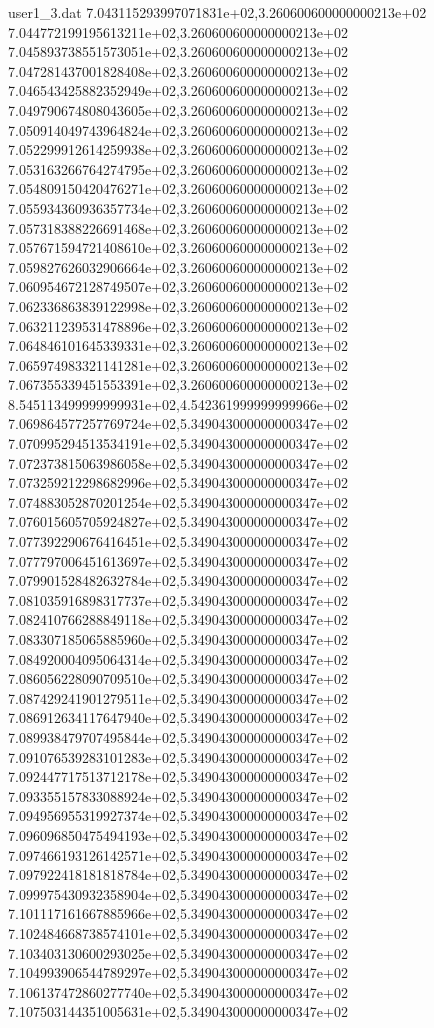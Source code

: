 \begin{filecontents}{user1_3.dat}
7.043115293997071831e+02,3.260600600000000213e+02
7.044772199195613211e+02,3.260600600000000213e+02
7.045893738551573051e+02,3.260600600000000213e+02
7.047281437001828408e+02,3.260600600000000213e+02
7.046543425882352949e+02,3.260600600000000213e+02
7.049790674808043605e+02,3.260600600000000213e+02
7.050914049743964824e+02,3.260600600000000213e+02
7.052299912614259938e+02,3.260600600000000213e+02
7.053163266764274795e+02,3.260600600000000213e+02
7.054809150420476271e+02,3.260600600000000213e+02
7.055934360936357734e+02,3.260600600000000213e+02
7.057318388226691468e+02,3.260600600000000213e+02
7.057671594721408610e+02,3.260600600000000213e+02
7.059827626032906664e+02,3.260600600000000213e+02
7.060954672128749507e+02,3.260600600000000213e+02
7.062336863839122998e+02,3.260600600000000213e+02
7.063211239531478896e+02,3.260600600000000213e+02
7.064846101645339331e+02,3.260600600000000213e+02
7.065974983321141281e+02,3.260600600000000213e+02
7.067355339451553391e+02,3.260600600000000213e+02
8.545113499999999931e+02,4.542361999999999966e+02
7.069864577257769724e+02,5.349043000000000347e+02
7.070995294513534191e+02,5.349043000000000347e+02
7.072373815063986058e+02,5.349043000000000347e+02
7.073259212298682996e+02,5.349043000000000347e+02
7.074883052870201254e+02,5.349043000000000347e+02
7.076015605705924827e+02,5.349043000000000347e+02
7.077392290676416451e+02,5.349043000000000347e+02
7.077797006451613697e+02,5.349043000000000347e+02
7.079901528482632784e+02,5.349043000000000347e+02
7.081035916898317737e+02,5.349043000000000347e+02
7.082410766288849118e+02,5.349043000000000347e+02
7.083307185065885960e+02,5.349043000000000347e+02
7.084920004095064314e+02,5.349043000000000347e+02
7.086056228090709510e+02,5.349043000000000347e+02
7.087429241901279511e+02,5.349043000000000347e+02
7.086912634117647940e+02,5.349043000000000347e+02
7.089938479707495844e+02,5.349043000000000347e+02
7.091076539283101283e+02,5.349043000000000347e+02
7.092447717513712178e+02,5.349043000000000347e+02
7.093355157833088924e+02,5.349043000000000347e+02
7.094956955319927374e+02,5.349043000000000347e+02
7.096096850475494193e+02,5.349043000000000347e+02
7.097466193126142571e+02,5.349043000000000347e+02
7.097922418181818784e+02,5.349043000000000347e+02
7.099975430932358904e+02,5.349043000000000347e+02
7.101117161667885966e+02,5.349043000000000347e+02
7.102484668738574101e+02,5.349043000000000347e+02
7.103403130600293025e+02,5.349043000000000347e+02
7.104993906544789297e+02,5.349043000000000347e+02
7.106137472860277740e+02,5.349043000000000347e+02
7.107503144351005631e+02,5.349043000000000347e+02

\end{filecontents}

